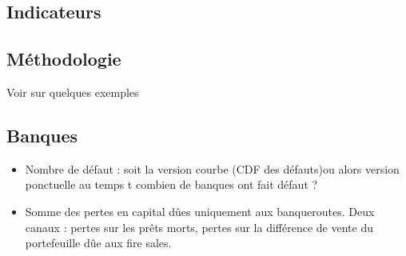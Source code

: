 \documentclass{article}
\begin{document}
\begin{appendices}








\section{Indicateurs}

\subsection{Méthodologie}

Voir sur quelques exemples

\subsection{Banques}
\begin{itemize}

	\item Nombre de défaut : soit la version courbe (CDF des défauts)ou alors version ponctuelle au temps t combien de banques ont fait défaut ? 
	
	\item Somme des pertes en capital dûes uniquement aux banqueroutes. Deux canaux  : pertes sur les prêts morts, pertes sur la différence de vente du portefeuille dûe aux fire sales.
	
\end{itemize}


\end{appendices}
\end{document}
